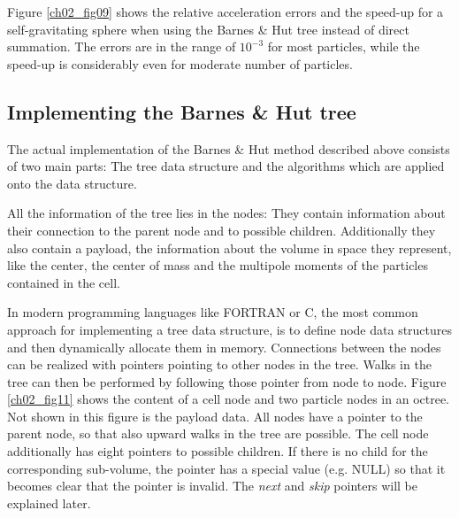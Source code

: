 Figure \ref{ch02_fig09} shows the relative acceleration errors and the speed-up for a self-gravitating sphere when using the Barnes \& Hut tree instead of direct summation. The errors are in the range of $10^{-3}$ for most particles, while the speed-up is considerably even for moderate number of particles.


\subsection{Implementing the Barnes \& Hut tree}
The actual implementation of the Barnes \& Hut method described above consists of two main parts: The tree data structure and the algorithms which are applied onto the data structure.

All the information of the tree lies in the nodes: They contain information about their connection to the parent node and to possible children. Additionally they also contain a payload, the information about the volume in space they represent, like the center, the center of mass and the multipole moments of the particles contained in the cell. 

In modern programming languages like FORTRAN or C, the most common approach for implementing a tree data structure, is to define node data structures and then dynamically allocate them in memory. Connections between the nodes can be realized with pointers pointing to other nodes in the tree. Walks in the tree can then be performed by following those pointer from node to node. Figure \ref{ch02_fig11} shows the content of a cell node and two particle nodes in an octree. Not shown in this figure is the payload data. All nodes have a pointer to the parent node, so that also upward walks in the tree are possible. The cell node additionally has eight pointers to possible children. If there is no child for the corresponding sub-volume, the pointer has a special value (e.g. NULL) so that it becomes clear that the pointer is invalid. The \emph{next} and \emph{skip} pointers will be explained later.

